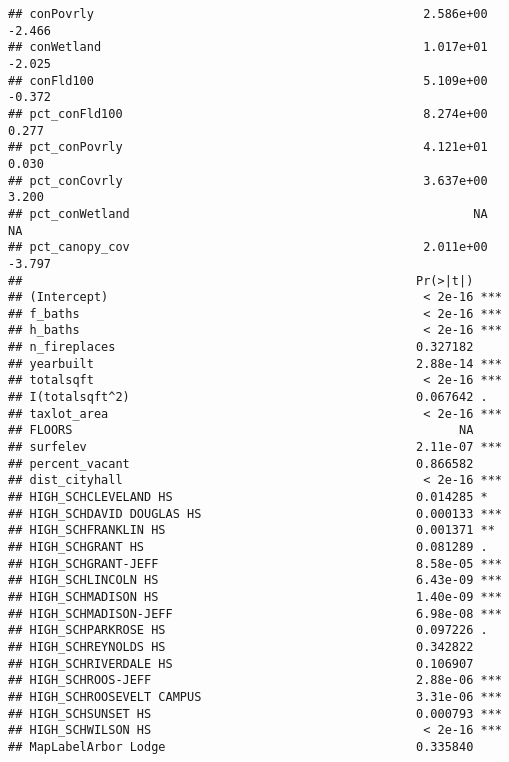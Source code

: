\documentclass[]{article}
\begin{document}
\begin{verbatim}
## conPovrly                                              2.586e+00  -2.466
## conWetland                                             1.017e+01  -2.025
## conFld100                                              5.109e+00  -0.372
## pct_conFld100                                          8.274e+00   0.277
## pct_conPovrly                                          4.121e+01   0.030
## pct_conCovrly                                          3.637e+00   3.200
## pct_conWetland                                                NA      NA
## pct_canopy_cov                                         2.011e+00  -3.797
##                                                       Pr(>|t|)    
## (Intercept)                                            < 2e-16 ***
## f_baths                                                < 2e-16 ***
## h_baths                                                < 2e-16 ***
## n_fireplaces                                          0.327182    
## yearbuilt                                             2.88e-14 ***
## totalsqft                                              < 2e-16 ***
## I(totalsqft^2)                                        0.067642 .  
## taxlot_area                                            < 2e-16 ***
## FLOORS                                                      NA    
## surfelev                                              2.11e-07 ***
## percent_vacant                                        0.866582    
## dist_cityhall                                          < 2e-16 ***
## HIGH_SCHCLEVELAND HS                                  0.014285 *  
## HIGH_SCHDAVID DOUGLAS HS                              0.000133 ***
## HIGH_SCHFRANKLIN HS                                   0.001371 ** 
## HIGH_SCHGRANT HS                                      0.081289 .  
## HIGH_SCHGRANT-JEFF                                    8.58e-05 ***
## HIGH_SCHLINCOLN HS                                    6.43e-09 ***
## HIGH_SCHMADISON HS                                    1.40e-09 ***
## HIGH_SCHMADISON-JEFF                                  6.98e-08 ***
## HIGH_SCHPARKROSE HS                                   0.097226 .  
## HIGH_SCHREYNOLDS HS                                   0.342822    
## HIGH_SCHRIVERDALE HS                                  0.106907    
## HIGH_SCHROOS-JEFF                                     2.88e-06 ***
## HIGH_SCHROOSEVELT CAMPUS                              3.31e-06 ***
## HIGH_SCHSUNSET HS                                     0.000793 ***
## HIGH_SCHWILSON HS                                      < 2e-16 ***
## MapLabelArbor Lodge                                   0.335840    

\end{verbatim}
\end{document}
